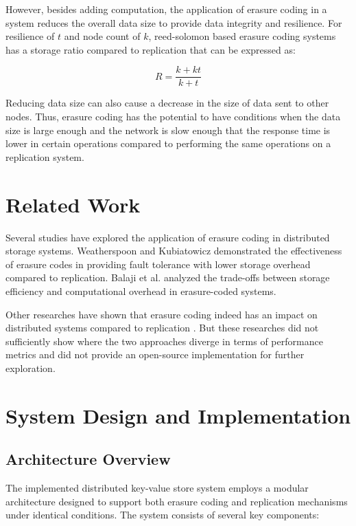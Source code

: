 However, besides adding computation, the application of erasure coding in a system reduces the overall data size to provide data integrity and resilience. For resilience of $t$ and node count of $k$, reed-solomon based erasure coding systems has a storage ratio compared to replication that can be expressed as:

\begin{equation}
	R = \frac{k + kt}{k + t}
\end{equation}

Reducing data size can also cause a decrease in the size of data sent to other nodes. Thus, erasure coding has the potential to have conditions when the data size is large enough and the network is slow enough that the response time is lower in certain operations compared to performing the same operations on a replication system.

\section{Related Work}

Several studies have explored the application of erasure coding in distributed storage systems. Weatherspoon and Kubiatowicz \cite{weatherspoon2002erasure} demonstrated the effectiveness of erasure codes in providing fault tolerance with lower storage overhead compared to replication. Balaji et al. \cite{balaji2018erasure} analyzed the trade-offs between storage efficiency and computational overhead in erasure-coded systems.

Other researches have shown that erasure coding indeed has an impact on distributed systems compared to replication \cite{mu2014paxos} \cite{wang2020craft}. But these researches did not sufficiently show where the two approaches diverge in terms of performance metrics and did not provide an open-source implementation for further exploration.

\section{System Design and Implementation}

\subsection{Architecture Overview}

The implemented distributed key-value store system employs a modular architecture designed to support both erasure coding and replication mechanisms under identical conditions. The system consists of several key components:

